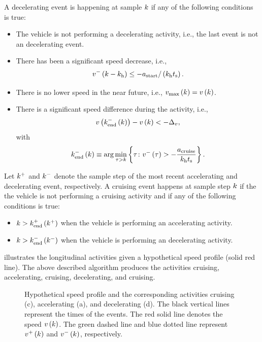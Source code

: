A decelerating event is happening at sample $k$ if any of the following conditions is true:
\begin{itemize}
	\item The vehicle is not performing a decelerating activity, i.e., the last event is not an decelerating event.
	\item \cstarta There has been a significant speed decrease, i.e., 
	\begin{equation}
		\label{eq:start deceleration}
		v^{-}\left(k-k_{\mathrm{h}}\right) \leq -a_\mathrm{start} / \left( k_{\mathrm{h}}t_\mathrm{s} \right).
	\end{equation} \cenda
	\item There is no lower speed in the near future, i.e., $v_\mathrm{max}\left(k\right)=v\left(k\right)$.
	\item There is a significant speed difference during the activity, i.e., 
	\begin{equation}
		v\left(k_{\mathrm{end}}^{-}\left(k\right)\right) - v\left(k\right) < -\Delta_{v},
	\end{equation}
	with
	\begin{equation}
		\label{eq:end deceleration}
		k_{\mathrm{end}}^{-}\left(k\right) \equiv \arg \min_{\tau > k} \left\{ \tau\colon v^{-}\left(\tau\right) > -\frac{a_\mathrm{cruise}}{k_{\mathrm{h}}t_\mathrm{s}} \right\}.
	\end{equation}
\end{itemize}

Let $k^{+}$ and $k^{-}$ denote the sample step of the most recent accelerating and decelerating event, respectively. A cruising event happens at sample step $k$ if the the vehicle is not performing a cruising activity and if any of the following conditions is true:
\begin{itemize}
	\item $k > k_{\mathrm{end}}^{+}\left(k^{+}\right)$ when the vehicle is performing an accelerating activity.
	\item $k > k_{\mathrm{end}}^{-}\left(k^{-}\right)$ when the vehicle is performing an decelerating activity.
\end{itemize}

\cstarta%
 illustrates the longitudinal activities given a hypothetical speed profile (solid red line). The above described algorithm produces the activities cruising, accelerating, cruising, decelerating, and cruising.
\cenda

\setlength{\figurewidth}{\linewidth}
\setlength{\figureheight}{0.7\linewidth}
\begin{figure}
	\centering
	
	\caption{\cstarta Hypothetical speed profile and the corresponding activities cruising (c), accelerating (a), and decelerating (d). The black vertical lines represent the times of the events. The red solid line denotes the speed $v\left(k\right)$. The green dashed line and blue dotted line represent $v^{+}\left(k\right)$ and $v^{-}\left(k\right)$, respectively.\cenda}
	\label{fig:longitudinal activities}
\end{figure}

